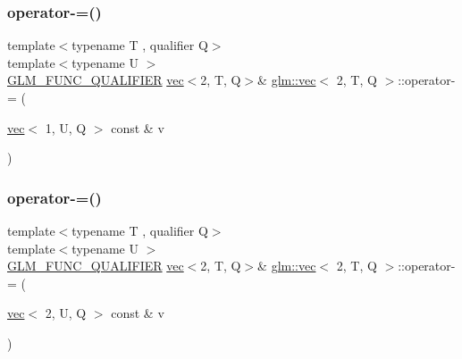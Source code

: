 \subsubsection{\texorpdfstring{operator-\/=()}{operator-=()}\hspace{0.1cm}{\footnotesize\ttfamily [5/6]}}
{\footnotesize\ttfamily template$<$typename T , qualifier Q$>$ \\
template$<$typename U $>$ \\
\mbox{\hyperlink{setup_8hpp_a33fdea6f91c5f834105f7415e2a64407}{G\+L\+M\+\_\+\+F\+U\+N\+C\+\_\+\+Q\+U\+A\+L\+I\+F\+I\+ER}} \mbox{\hyperlink{structglm_1_1vec}{vec}}$<$2, T, Q$>$\& \mbox{\hyperlink{structglm_1_1vec}{glm\+::vec}}$<$ 2, T, Q $>$\+::operator-\/= (\begin{DoxyParamCaption}\item[{\mbox{\hyperlink{structglm_1_1vec}{vec}}$<$ 1, U, Q $>$ const \&}]{v }\end{DoxyParamCaption})}

\mbox{\label{structglm_1_1vec_3_012_00_01_t_00_01_q_01_4_ae73ba64842a46d90b3e6a61df288f70d}} 
\subsubsection{\texorpdfstring{operator-\/=()}{operator-=()}\hspace{0.1cm}{\footnotesize\ttfamily [6/6]}}
{\footnotesize\ttfamily template$<$typename T , qualifier Q$>$ \\
template$<$typename U $>$ \\
\mbox{\hyperlink{setup_8hpp_a33fdea6f91c5f834105f7415e2a64407}{G\+L\+M\+\_\+\+F\+U\+N\+C\+\_\+\+Q\+U\+A\+L\+I\+F\+I\+ER}} \mbox{\hyperlink{structglm_1_1vec}{vec}}$<$2, T, Q$>$\& \mbox{\hyperlink{structglm_1_1vec}{glm\+::vec}}$<$ 2, T, Q $>$\+::operator-\/= (\begin{DoxyParamCaption}\item[{\mbox{\hyperlink{structglm_1_1vec}{vec}}$<$ 2, U, Q $>$ const \&}]{v }\end{DoxyParamCaption})}

\mbox{\label{structglm_1_1vec_3_012_00_01_t_00_01_q_01_4_aa8482a8ff3984a1cb04caf5e3e684f71}} 
